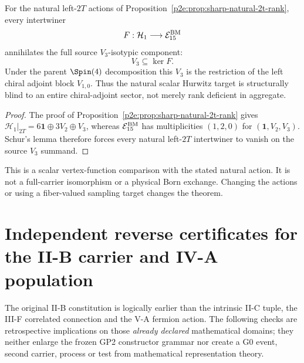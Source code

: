 \documentclass[11pt,a4paper]{article}
\begin{document}
\begin{corollary}
\label{p2e:cor:v261-natural-hurwitz-v3-blindness}
For the natural left-\(2T\) actions of
Proposition~\ref{p2e:prop:sharp-natural-2t-rank}, every intertwiner
\[
 F:\mathcal H_1\longrightarrow\mathcal E_{15}^{\rm BM}
\]
annihilates the full source \(V_3\)-isotypic component:
\[
 \boxed{V_3\subseteq\ker F.}
\]
Under the parent \(\Spin(4)\) decomposition this \(V_3\) is the restriction of
the left chiral adjoint block \(V_{1,0}\).  Thus the natural scalar Hurwitz
target is structurally blind to an entire chiral-adjoint sector, not merely
rank deficient in aggregate.
\end{corollary}

\begin{proof}
The proof of Proposition~\ref{p2e:prop:sharp-natural-2t-rank} gives
\(\mathcal H_1|_{2T}=6\mathbf1\oplus3V_2\oplus V_3\), whereas
\(\mathcal E_{15}^{\rm BM}\) has multiplicities \((1,2,0)\) for
\((\mathbf1,V_2,V_3)\).  Schur's lemma therefore forces every natural
left-\(2T\) intertwiner to vanish on the source \(V_3\) summand.
\end{proof}


This is a scalar vertex-function comparison with the stated natural action.
It is not a full-carrier isomorphism or a physical Born exchange. Changing
the actions or using a fiber-valued sampling target changes the theorem.





\section{Independent reverse certificates for the II-B carrier and IV-A population}
\label{p2f:sec:v264-two-bracket-action-audit}
The original II-B constitution is logically earlier than the intrinsic
II-C tuple, the III-F correlated connection and the V-A fermion action.
The following checks are retrospective implications on those
\emph{already declared} mathematical domains; they neither enlarge the
frozen GP2 constructor grammar nor create a G0 event, second carrier,
process or test from mathematical representation theory.
\end{document}
